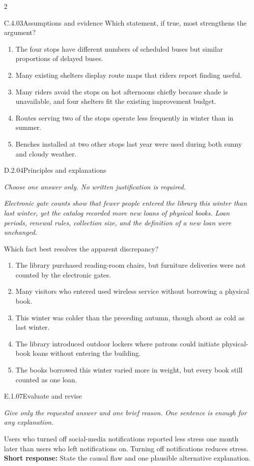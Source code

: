 \documentclass[9pt]{extarticle}
\newcommand{\choice}[1]{\item #1}
\begin{document}
\begin{multicols}{2}
\begin{DenseCoreProblem}{C.4.03}{Assumptions and evidence}
Which statement, if true, most strengthens the argument?
\begin{enumerate}[label=(\alph*)]
  \choice{The four stops have different numbers of scheduled buses but similar proportions of delayed buses.}
  \choice{Many existing shelters display route maps that riders report finding useful.}
  \choice{Many riders avoid the stops on hot afternoons chiefly because shade is unavailable, and four shelters fit the existing improvement budget.}
  \choice{Routes serving two of the stops operate less frequently in winter than in summer.}
  \choice{Benches installed at two other stops last year were used during both sunny and cloudy weather.}
\end{enumerate}
\end{DenseCoreProblem}
\begin{DenseCoreProblem}{D.2.04}{Principles and explanations}
{\scriptsize\textit{Choose one answer only. No written justification is required.}\par}
\emph{Electronic gate counts show that fewer people entered the library this winter than last winter, yet the catalog recorded more new loans of physical books. Loan periods, renewal rules, collection size, and the definition of a new loan were unchanged.}

Which fact best resolves the apparent discrepancy?
\begin{enumerate}[label=(\alph*)]
  \choice{The library purchased reading-room chairs, but furniture deliveries were not counted by the electronic gates.}
  \choice{Many visitors who entered used wireless service without borrowing a physical book.}
  \choice{This winter was colder than the preceding autumn, though about as cold as last winter.}
  \choice{The library introduced outdoor lockers where patrons could initiate physical-book loans without entering the building.}
  \choice{The books borrowed this winter varied more in weight, but every book still counted as one loan.}
\end{enumerate}
\end{DenseCoreProblem}
\begin{DenseCoreProblem}{E.1.07}{Evaluate and revise}
{\scriptsize\textit{Give only the requested answer and one brief reason. One sentence is enough for any explanation.}\par}
Users who turned off social-media notifications reported less stress one month later than users who left notifications on. Turning off notifications reduces stress.
\textbf{Short response:} State the causal flaw and one plausible alternative explanation.
\end{DenseCoreProblem}
\end{multicols}
\end{document}
